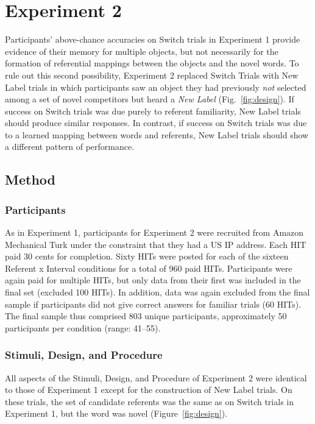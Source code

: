 \documentclass[man,floatsintext]{apa6}
\begin{document}
\section{Experiment 2}

Participants' above-chance accuracies on Switch trials in Experiment 1 provide evidence of their memory for multiple objects, but not necessarily for the formation of referential mappings between the objects and the novel words. To rule out this second possibility, Experiment 2 replaced Switch Trials with New Label trials in which participants saw an object they had previously \emph{not} selected among a set of novel competitors but heard a \emph{New Label} (Fig.~\ref{fig:design}). If success on Switch trials was due purely to referent familiarity, New Label trials should produce similar responses. In contrast, if success on Switch trials was due to a learned mapping between words and referents, New Label trials should show a different pattern of performance.

\subsection{Method}

\subsubsection{Participants}

As in Experiment 1, participants for Experiment 2 were recruited from Amazon Mechanical Turk under the constraint that they had a US IP address. Each HIT paid 30 cents for completion. Sixty HITs were posted for each of the sixteen Referent x Interval conditions for a total of 960 paid HITs. Participants were again paid for multiple HITs, but only data from their first was included in the final set (excluded 100 HITs). In addition, data was again excluded from the final sample if participants did not give correct answers for familiar trials (60 HITs). The final sample thus comprised 803 unique participants, approximately 50 participants per condition (range: 41--55).

\subsubsection{Stimuli, Design, and Procedure}

All aspects of the Stimuli, Design, and Procedure of Experiment 2 were identical to those of Experiment 1 except for the construction of New Label trials. On these trials, the set of candidate referents was the same as on Switch trials in Experiment 1, but the word was novel (Figure~\ref{fig:design}).
\end{document}
